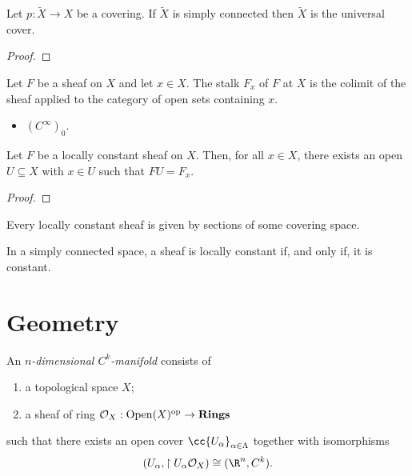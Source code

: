 \documentclass{article}
\begin{document}
\begin{theorem}
  Let $p:\tilde X\to X$ be a covering. If $\tilde X$ is simply connected then
  $\tilde X$ is the universal cover.
  \begin{proof}
    \missingproof
  \end{proof}
\end{theorem}

\begin{definition}
  Let $F$ be a sheaf on $X$ and let $x\in X$. The stalk $F_x$ of $F$ at $X$ is the
  colimit of the sheaf applied to the category of open sets containing $x$.
\end{definition}

\begin{example}
  \begin{itemize}
    \item $(C^\infty)_0$.
  \end{itemize}
\end{example}

\begin{lemma}
  Let $F$ be a locally constant sheaf on $X$. Then, for all $x\in X$, there exists
  an open $U\subseteq X$ with $x\in U$ such that $FU=F_x$.
  \begin{proof}
    \missingproof
  \end{proof}
\end{lemma}

\begin{theorem}
  Every locally constant sheaf is given by sections of some covering space.
\end{theorem}

\begin{theorem}
  In a simply connected space, a sheaf is locally constant if, and only if,
  it is constant.
\end{theorem}

\section{Geometry}

\begin{definition}
  An \emph{$n$-dimensional $C^k$-manifold} consists of
  \begin{enumerate}
    \item a topological space $X$;
    \item a sheaf of ring $\mathcal O_X:\operatorname{Open}(X)^{\text{op}}\to\textbf{Rings}$
  \end{enumerate}
  such that there exists an open cover $\cc{U_\alpha}_{\alpha\in\Lambda}$
  together with isomorphisms
  \begin{align*}
    (U_\alpha,\restriction{U_\alpha}{\mathcal O_X})\cong (\R^n,C^k).
  \end{align*}
\end{definition}
\end{document}
